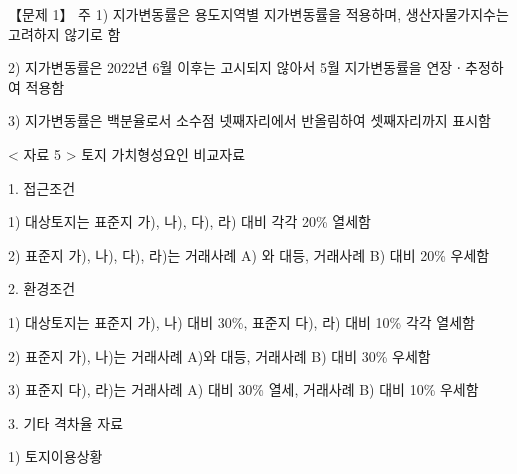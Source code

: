 \begin{longquestion}{【문제 1】}
주 1) 지가변동률은 용도지역별 지가변동률을 적용하며, 생산자물가지수는 고려하지 않기로 함 \par
2) 지가변동률은 2022년 6월 이후는 고시되지 않아서 5월 지가변동률을 연장ㆍ추정하여 적용함 \par
3) 지가변동률은 백분율로서 소수점 넷째자리에서 반올림하여 셋째자리까지 표시함 \par
< 자료 5 > 토지 가치형성요인 비교자료 \par
1. 접근조건 \par
1) 대상토지는 표준지 가), 나), 다), 라) 대비 각각 20\% 열세함 \par
2) 표준지 가), 나), 다), 라)는 거래사례 A) 와 대등, 거래사례 B) 대비 20\% 우세함 \par
2. 환경조건 \par
1) 대상토지는 표준지 가), 나) 대비 30\%, 표준지 다), 라) 대비 10\% 각각 열세함 \par
2) 표준지 가), 나)는 거래사례 A)와 대등, 거래사례 B) 대비 30\% 우세함 \par
3) 표준지 다), 라)는 거래사례 A) 대비 30\% 열세, 거래사례 B) 대비 10\% 우세함 \par
3. 기타 격차율 자료 \par
1) 토지이용상황 \par
{\small\centering\renewcommand{\arraystretch}{1.25}
\par}


\end{longquestion}
